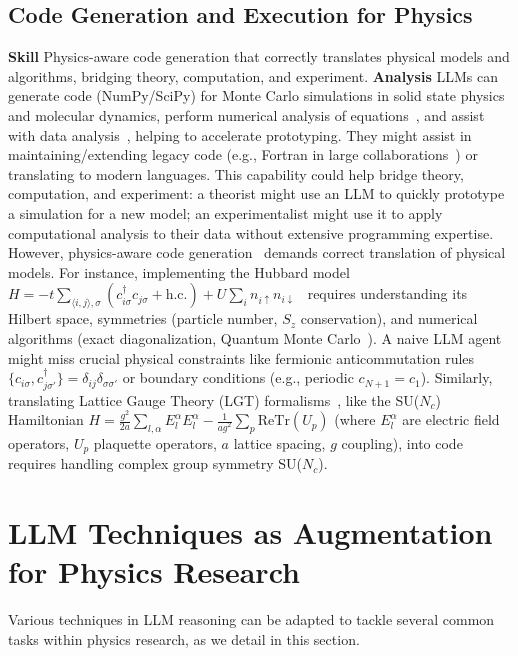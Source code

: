 \subsection{Code Generation and Execution for Physics}
\label{sec:code_skills_physics}
\textbf{Skill} Physics-aware code generation that correctly translates physical models and algorithms, bridging theory, computation, and experiment.
\textbf{Analysis}
LLMs can generate code (NumPy/SciPy) for Monte Carlo simulations in solid state physics and molecular dynamics, perform numerical analysis of equations~\cite{Cherian2024LLMPhy}, and assist with data analysis~\cite{Gao2023PAL}, helping to accelerate prototyping. They might assist in maintaining/extending legacy code (e.g., Fortran in large collaborations~\cite{Zhou2024Proofofconcept}) or translating to modern languages. This capability could help bridge theory, computation, and experiment: a theorist might use an LLM to quickly prototype a simulation for a new model; an experimentalist might use it to apply computational analysis to their data without extensive programming expertise.
However, physics-aware code generation~\cite{Tian2024SciCode} demands correct translation of physical models. For instance, implementing the Hubbard model $H = -t \sum_{\langle i,j \rangle, \sigma} (c_{i\sigma}^\dagger c_{j\sigma} + \text{h.c.}) + U \sum_i n_{i\uparrow} n_{i\downarrow}$~\cite{Auerbach1994Interacting} requires understanding its Hilbert space, symmetries (particle number, $S_z$ conservation), and numerical algorithms (exact diagonalization, Quantum Monte Carlo~\cite{Becca2017Quantum}). A naive LLM agent might miss crucial physical constraints like fermionic anticommutation rules $\{c_{i\sigma}, c_{j\sigma'}^\dagger\} = \delta_{ij}\delta_{\sigma\sigma'}$ or boundary conditions (e.g., periodic $c_{N+1} = c_1$). Similarly, translating Lattice Gauge Theory (LGT) formalisms~\cite{Wilson1974Confinement}, like the SU($N_c$) Hamiltonian $H = \frac{g^2}{2a} \sum_{l, \alpha} E_l^\alpha E_l^\alpha - \frac{1}{ag^2} \sum_p \text{ReTr}(U_p)$ (where $E_l^\alpha$ are electric field operators, $U_p$ plaquette operators, $a$ lattice spacing, $g$ coupling), into code requires handling complex group symmetry SU($N_c$).

\section{LLM Techniques as Augmentation for Physics Research}
\label{sec:llm_engineering_skills}
Various techniques in LLM reasoning can be adapted to tackle several common tasks within physics research, as we detail in this section.
